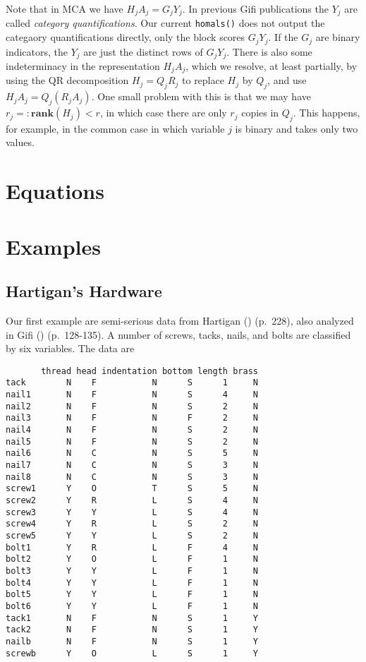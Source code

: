 \documentclass[
  12pt,
  letterpaper,
]{scrbook}
\newcommand{\df}{=:}
\begin{document}
Note that in MCA we have \(H_jA_j=G_jY_j\). In previous Gifi
publications the \(Y_j\) are called \emph{category quantifications}. Our
current \texttt{homals()} does not output the categaory quantifications
directly, only the block scores \(G_jY_j\). If the \(G_j\) are binary
indicators, the \(Y_j\) are just the distinct rows of \(G_jY_j\). There
is also some indeterminacy in the representation \(H_jA_j\), which we
resolve, at least partially, by using the QR decomposition
\(H_j=Q_jR_j\) to replace \(H_j\) by \(Q_j\), and use
\(H_jA_j=Q_j(R_jA_j)\). One small problem with this is that we may have
\(r_j\df\mathbf{rank}(H_j)<r\), in which case there are only \(r_j\)
copies in \(Q_j\). This happens, for example, in the common case in
which variable \(j\) is binary and takes only two values.

\section{Equations}\label{equations}

\section{Examples}\label{examples}

\subsection{Hartigan's Hardware}\label{hartigans-hardware}

Our first example are semi-serious data from Hartigan
() (p.~228), also analyzed in Gifi
() (p.~128-135). A number of screws,
tacks, nails, and bolts are classified by six variables. The data are

\begin{verbatim}
       thread head indentation bottom length brass
tack        N    F           N      S      1     N
nail1       N    F           N      S      4     N
nail2       N    F           N      S      2     N
nail3       N    F           N      F      2     N
nail4       N    F           N      S      2     N
nail5       N    F           N      S      2     N
nail6       N    C           N      S      5     N
nail7       N    C           N      S      3     N
nail8       N    C           N      S      3     N
screw1      Y    O           T      S      5     N
screw2      Y    R           L      S      4     N
screw3      Y    Y           L      S      4     N
screw4      Y    R           L      S      2     N
screw5      Y    Y           L      S      2     N
bolt1       Y    R           L      F      4     N
bolt2       Y    O           L      F      1     N
bolt3       Y    Y           L      F      1     N
bolt4       Y    Y           L      F      1     N
bolt5       Y    Y           L      F      1     N
bolt6       Y    Y           L      F      1     N
tack1       N    F           N      S      1     Y
tack2       N    F           N      S      1     Y
nailb       N    F           N      S      1     Y
screwb      Y    O           L      S      1     Y
\end{verbatim}
\end{document}
